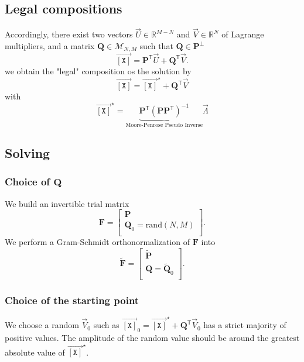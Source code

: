 \documentclass[aps,twocolumn]{revtex4}
\newcommand{\myconc}[1]{\left\lbrack #1 \right\rbrack}
\newcommand{\mychem}[1]{{\mathtt{#1}}}
\newcommand{\mymat}[1]{\boldsymbol{#1}}
\newcommand{\mytrn}[1]{{#1}^{\mathsf{T}}}
\newcommand{\myvec}[1]{\overrightarrow{#1}}
\newcommand{\vecX}{\myvec{\myconc{\mychem{X}}}}
\begin{document}
\subsection{Legal compositions}
Accordingly, there exist two vectors $\vec{U}\in\mathbb{R}^{M-N}$ and $\vec{V}\in \mathbb{R}^{N}$ of Lagrange multipliers, and
a matrix  $\mymat{Q}\in\mathcal{M}_{N,M}$ such that $\mymat{Q}\in\mymat{P}^\perp$
\begin{equation}
	\vecX = \mytrn{\mymat{P}} \vec{U} + \mytrn{\mymat{Q}}\vec{V}.
\end{equation}
we obtain the "legal" composition os the solution by
\begin{equation}
	\vecX = \vecX^\star + \mytrn{\mymat{Q}}\vec{V}
\end{equation}
with 
\begin{equation}
	\vecX^\star= \underbrace{\mytrn{\mymat{P}} \left(\mymat{P} \mytrn{\mymat{P}}\right)^{-1}}_{\text{Moore-Penrose Pseudo Inverse}} \vec{\Lambda}
\end{equation}

\subsection{Solving}
\subsubsection{Choice of $\mymat{Q}$}
We build an invertible trial matrix
\begin{equation}
	\mymat{F} = 
	\left\lbrack
	\begin{array}{c}
		\mymat{P}\\
		\mymat{Q}_0=\text{rand}(N,M)\\
	\end{array}
	\right\rbrack.
\end{equation}
We perform a Gram-Schmidt orthonormalization of $\mymat{F}$ into
\begin{equation}
	\tilde{\mymat{F}} = 
	\left\lbrack
	\begin{array}{c}
		\tilde{\mymat{P}}\\
		\mymat{Q}=\tilde{\mymat{Q}}_0\\
	\end{array}
	\right\rbrack.
\end{equation}

\subsubsection{Choice of the starting point}
We choose a random $\vec{V}_0$ such as $\vecX_0 = \vecX^\star +  \mytrn{\mymat{Q}}\vec{V}_0$ has a strict majority of
positive values.
The amplitude of the random value
should be around the greatest absolute value of $\vecX^\star$.
\end{document}
